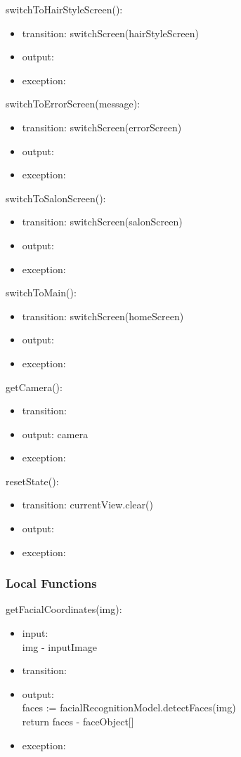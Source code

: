 \documentclass[12pt, titlepage]{article}
\begin{document}
\noindent switchToHairStyleScreen():
\begin{itemize}
\item transition: switchScreen(hairStyleScreen) 
\item output:
\item exception:
\end{itemize}

\noindent switchToErrorScreen(message):
\begin{itemize}
\item transition: switchScreen(errorScreen) 
\item output:
\item exception: 
\end{itemize}

\noindent switchToSalonScreen():
\begin{itemize}
\item transition: switchScreen(salonScreen) 
\item output:
\item exception:
\end{itemize}

\noindent switchToMain():
\begin{itemize}
\item transition: switchScreen(homeScreen) 
\item output:
\item exception: 
\end{itemize}

\noindent getCamera():
\begin{itemize}
\item transition:
\item output: camera
\item exception:
\end{itemize}

\noindent resetState():
\begin{itemize}
\item transition: currentView.clear()
\item output: 
\item exception: 
\end{itemize}

\subsubsection{Local Functions}

\noindent getFacialCoordinates(img):
\begin{itemize}
\item input: \\
img - inputImage 
\item transition:
\item output: \\
faces := facialRecognitionModel.detectFaces(img) \\
return faces - faceObject[]
\item exception:
\end{itemize}
\end{document}
